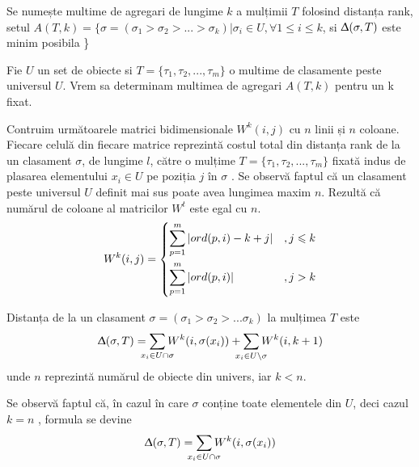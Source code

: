 \begin{definition}
\label{def:Aset}
Se numește multime de agregari de lungime $k$ a mulțimii $T$ folosind distanța rank, setul
$
  A(T, k) = \{\sigma=(\sigma_1 > \sigma_2 > ... > \sigma_k) | \sigma_i \in U, 
  \forall 1 \leqslant i \leqslant k$, si 
  $\Updelta(\sigma, T)$ este minim posibila \}
\end{definition}


\begin{problem}
Fie $U$ un set de obiecte si $T = \{\tau_1, \tau_2, ..., \tau_m\}$ o multime de clasamente peste
universul $U$. Vrem sa determinam multimea de agregari $A(T, k)$ pentru un k fixat. 
\end{problem}

Contruim următoarele matrici bidimensionale $W^k(i, j)$ cu $n$ linii și $n$ coloane. Fiecare celulă
din fiecare matrice reprezintă costul total din distanța rank de la un clasament $\sigma$, de 
lungime $l$, către o mulțime $T = \{\tau_1, \tau_2, ..., \tau_m\}$ fixată indus de plasarea 
elementului $x_i \in U$ pe poziția $j$ în $\sigma$ \cite{rankaggregationproblem}. Se observă faptul
că un clasament peste universul $U$ definit mai sus poate avea lungimea maxim $n$. Rezultă că 
numărul de coloane al matricilor $W^t$ este egal cu $n$.
\begin{gather}
  \label{eq:wmatrix}
  W^k(i, j) = \begin{dcases}
    \smashoperator{\sum_{p=1}^{m}} | ord(p, i) - k + j |    &, j \leqslant k \\
    \smashoperator{\sum_{p=1}^{m}} | ord(p, i) |            &, j > k
  \end{dcases}
\end{gather}

\begin{remark}
Distanța de la un clasament $\sigma=(\sigma_1 > \sigma_2 > ... \sigma_k)$ la mulțimea $T$ este
\[
  \Updelta(\sigma, T) = \smashoperator{\sum_{x_i \in U \cap \sigma}} W^k(i, \sigma(x_i)) +
      \smashoperator{\sum_{x_i \in U \setminus \sigma}} W^k(i, k + 1)
\]unde $n$ reprezintă numărul de obiecte din univers, iar $k < n$.
\end{remark}
Se observă faptul că, în cazul în care $\sigma$ conține toate elementele din $U$, deci cazul $k = n$
, formula se devine
\begin{gather}
  \label{eq:minimize}
  \Updelta(\sigma, T) = \smashoperator{\sum_{x_i \in U \cap \sigma}} W^k(i, \sigma(x_i))
\end{gather}

